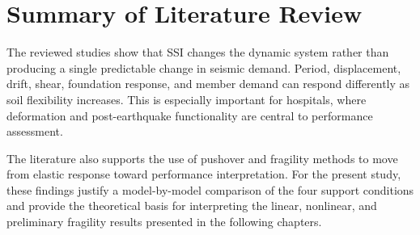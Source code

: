 \section{Summary of Literature Review}
The reviewed studies show that SSI changes the dynamic system rather than producing a single predictable change in seismic demand. Period, displacement, drift, shear, foundation response, and member demand can respond differently as soil flexibility increases. This is especially important for hospitals, where deformation and post-earthquake functionality are central to performance assessment.

The literature also supports the use of pushover and fragility methods to move from elastic response toward performance interpretation. For the present study, these findings justify a model-by-model comparison of the four support conditions and provide the theoretical basis for interpreting the linear, nonlinear, and preliminary fragility results presented in the following chapters.
